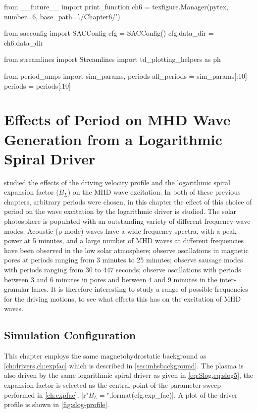 \begin{pycode}[chapter6]
from __future__ import print_function
ch6 = texfigure.Manager(pytex, number=6, base_path='./Chapter6/')

from sacconfig import SACConfig
cfg = SACConfig()
cfg.data_dir = ch6.data_dir

from streamlines import Streamlines
import td_plotting_helpers as ph

from period_amps import sim_params, periods
all_periods = sim_params[:10]
periods = periods[:10]
\end{pycode}

\chapter{Effects of Period on MHD Wave Generation from a Logarithmic Spiral Driver}\label{ch:period}

 studied the effects of the driving velocity profile and the logarithmic spiral expansion factor ($B_L$) on the MHD wave excitation.
In both of these previous chapters, arbitrary periods were chosen, in this chapter the effect of this choice of period on the wave excitation by the logarithmic driver is studied.
The solar photosphere is populated with an outstanding variety of different frequency wave modes.
Acoustic (p-mode) waves have a wide frequency spectra, with a peak power at 5 minutes, and a large number of MHD waves at different frequencies have been observed in the low solar atmosphere; \cite{Freij2014,Dorotovic2014} observe oscillations in magnetic pores at periods ranging from 3 minutes to 25 minutes; \cite{morton2011} observe sausage modes with periods ranging from $30$ to $447$ seconds; \cite{fujimura2009} observe oscillations with periods between $3$ and $6$ minutes in pores and between $4$ and $9$ minutes in the inter-granular lanes.
It is therefore interesting to study a range of possible frequencies for the driving motions, to see what effects this has on the excitation of MHD waves.

\section{Simulation Configuration}\label{sec:periodconfig}
This chapter employs the same magnetohydrostatic background as \cref{ch:drivers,ch:expfac} which is described in \cref{sec:mhsbackground}.
The plasma is also driven by the same logarithmic spiral driver as given in \cref{eq:Slog,eq:slog5}, the expansion factor is selected as the central point of the parameter sweep performed in \cref{ch:expfac}, \py[chapter6]|r"$B_L={}$".format(cfg.exp_fac)|.
A plot of the driver profile is shown in \cref{fig:slog-profile}.

